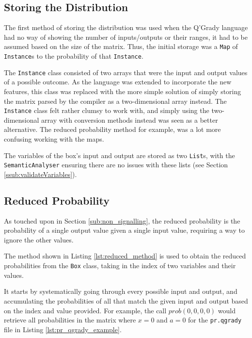 \documentclass[report.tex]{subfiles}
\begin{document}
\subsection{Storing the Distribution} %
\label{sub:storing_the_distribution}
The first method of storing the distribution was used when the Q'Grady language
had no way of showing the number of inputs/outputs or their ranges, it had to be
assumed based on the size of the matrix. Thus, the initial storage was a
\texttt{Map} of \texttt{Instance}s to the probability of that \texttt{Instance}.

The \texttt{Instance} class consisted of two arrays that were the input and
output values of a possible outcome. As the language was extended to incorporate
the new features, this class was replaced with the more simple solution of
simply storing the matrix parsed by the compiler as a two-dimensional array
instead. The \texttt{Instance} class felt rather clumsy to work with, and simply
using the two-dimensional array with conversion methods instead was seen as a
better alternative. The reduced probability method for example, was a lot more
confusing working with the maps.

The variables of the box's input and output are stored as two \texttt{List}s,
with the \texttt{SemanticAnalyser} ensuring there are no issues with these
lists (see Section \ref{ssub:validateVariables}).

\subsection{Reduced Probability} %
\label{sub:reduced_probability}
As touched upon in Section \ref{sub:non_signalling}, the reduced probability is
the probability of a single output value given a single input value, requiring
a way to ignore the other values.

 

The method shown in Listing \ref{lst:reduced_method} is used to obtain the
reduced probabilities from the \texttt{Box} class, taking in the index of
two variables and their values.

It starts by systematically going through every possible input and output, and
accumulating the probabilities of all that match the given input and output
based on the index and value provided. For example, the call
\(prob(0, 0, 0, 0)\) would retrieve all probabilities in the matrix where
\(x = 0\) and \(a = 0\) for the \texttt{pr.qgrady} file in Listing
\ref{lst:pr_qgrady_example}.
\end{document}
